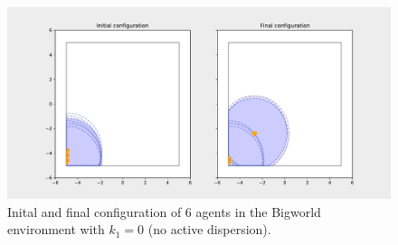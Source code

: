 \begin{figure}[H]
  \centering
  \includegraphics[width=\textwidth]{figs/bigworld_6_agnt_k_1_0_k_2_1_distr.pdf}
  \caption{Inital and final configuration of 6 agents in the Bigworld environment with $k_{1} = 0$ (no active dispersion).}
  \label{fig:6_agnt_bw_k_1_0_k_2_1_distr}
\end{figure}
